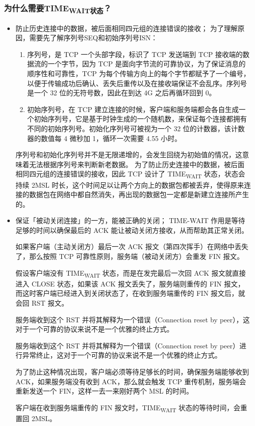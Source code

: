 \documentclass[11pt]{article}
\begin{document}
\subsubsection{为什么需要TIME\textsubscript{WAIT状态}？}
\label{sec:org50d4f7c}
\begin{itemize}
\item 防止历史连接中的数据，被后面相同四元组的连接错误的接收；
为了理解原因，需要先了解序列号SEQ和初始序列号ISN：
\begin{enumerate}
\item 序列号，是 TCP 一个头部字段，标识了 TCP 发送端到 TCP 接收端的数据流的一个字节，因为 TCP 是面向字节流的可靠协议，为了保证消息的顺序性和可靠性，TCP 为每个传输方向上的每个字节都赋予了一个编号，以便于传输成功后确认、丢失后重传以及在接收端保证不会乱序。序列号是一个 32 位的无符号数，因此在到达 4G 之后再循环回到 0。
\item 初始序列号，在 TCP 建立连接的时候，客户端和服务端都会各自生成一个初始序列号，它是基于时钟生成的一个随机数，来保证每个连接都拥有不同的初始序列号。初始化序列号可被视为一个 32 位的计数器，该计数器的数值每 4 微秒加 1，循环一次需要 4.55 小时。
\end{enumerate}

序列号和初始化序列号并不是无限递增的，会发生回绕为初始值的情况，这意味着无法根据序列号来判断新老数据。
为了防止历史连接中的数据，被后面相同四元组的连接错误的接收，因此 TCP 设计了 TIME\textsubscript{WAIT} 状态，状态会持续 2MSL 时长，这个时间足以让两个方向上的数据包都被丢弃，使得原来连接的数据包在网络中都自然消失，再出现的数据包一定都是新建立连接所产生的。

\item 保证「被动关闭连接」的一方，能被正确的关闭；
TIME-WAIT 作用是等待足够的时间以确保最后的 ACK 能让被动关闭方接收，从而帮助其正常关闭。

如果客户端（主动关闭方）最后一次 ACK 报文（第四次挥手）在网络中丢失了，那么按照 TCP 可靠性原则，服务端（被动关闭方）会重发 FIN 报文。

假设客户端没有 TIME\textsubscript{WAIT} 状态，而是在发完最后一次回 ACK 报文就直接进入 CLOSE 状态，如果该 ACK 报文丢失了，服务端则重传的 FIN 报文，而这时客户端已经进入到关闭状态了，在收到服务端重传的 FIN 报文后，就会回 RST 报文。

服务端收到这个 RST 并将其解释为一个错误（Connection reset by peer），这对于一个可靠的协议来说不是一个优雅的终止方式。

服务端收到这个 RST 并将其解释为一个错误（Connection reset by peer）进行异常终止，这对于一个可靠的协议来说不是一个优雅的终止方式。

为了防止这种情况出现，客户端必须等待足够长的时间，确保服务端能够收到 ACK，如果服务端没有收到 ACK，那么就会触发 TCP 重传机制，服务端会重新发送一个 FIN，这样一去一来刚好两个 MSL 的时间。

客户端在收到服务端重传的 FIN 报文时，TIME\textsubscript{WAIT} 状态的等待时间，会重置回 2MSL。
\end{itemize}
\end{document}

